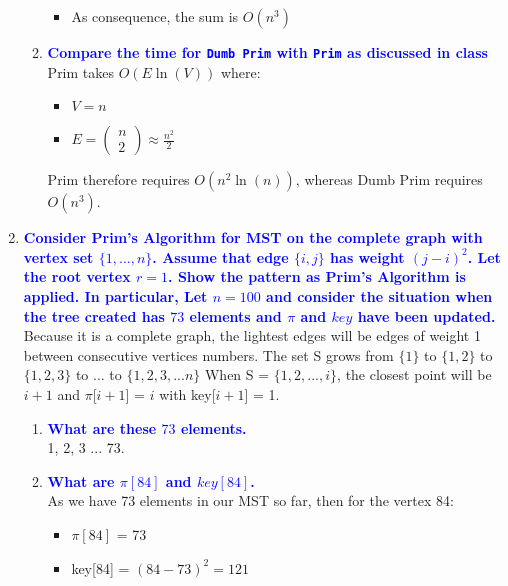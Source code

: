 \documentclass[11pt]{article}
\begin{document}
\begin{enumerate}
\begin{enumerate}
\begin{itemize}
            \item As consequence, the sum is $O(n^3)$
        \end{itemize}
    \item \textbf{\textcolor{blue}{Compare the time for {\tt Dumb Prim} with {\tt Prim} as discussed in class}}
        \\ Prim takes $O(E\ln(V))$ where:
        \begin{itemize}
            \item $V = n$
            \item $E = \left(\begin{smallmatrix} n \\ 2 \end{smallmatrix}\right) \approx \frac{n^2}{2}$
        \end{itemize}
        Prim therefore requires $O(n^2\ln(n))$, whereas Dumb Prim requires $O(n^3)$.
\end{enumerate}

\item \textbf{\textcolor{blue}{Consider Prim's Algorithm for MST on the complete graph with vertex set $\{1,\ldots,n\}$.  Assume that edge $\{i,j\}$ has weight $(j-i)^2$.  Let the root vertex $r=1$.  Show the pattern as Prim's Algorithm is applied. In particular, Let $n=100$ and consider the situation when the tree created has $73$ elements and $\pi$ and $key$ have been updated.}}
    \\ Because it is a complete graph, the lightest edges will be edges of weight 1 between consecutive vertices numbers. 
    The set S grows from $\{1\}$ to $\{1,2\}$ to $\{1,2,3\}$ to ... to $\{1,2,3, ... n\}$
    When S = $\{1,2,...,i\}$, the closest point will be $i+1$ and $\pi$[$i+1$] = $i$ with key[$i+1$] = 1.
\begin{enumerate}
    \item \textbf{\textcolor{blue}{What are these $73$ elements.}}
        \\ 1, 2, 3 ... 73.
    \item \textbf{\textcolor{blue}{What are $\pi[84]$ and $key[84]$.}}
        \\ As we have 73 elements in our MST so far, then for the vertex 84:
        \begin{itemize}
            \item $\pi[84]$ = 73
            \item key[84] = $(84 - 73)^2 = 121$
        \end{itemize}
\end{enumerate}


\end{enumerate}
\end{document}
